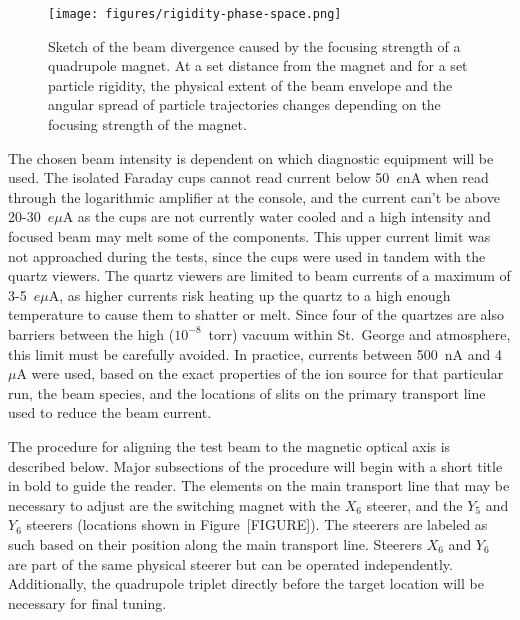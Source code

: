 \begin{figure}[t]
    \begin{center}
        \centerline{\texttt{[image: figures/rigidity-phase-space.png]}}
            \caption[Sketch of beam divergence due to focusing
            strength]{Sketch of the beam divergence caused by the
            focusing strength of a quadrupole magnet. At a set distance
            from the magnet and for a set particle rigidity, the
            physical extent of the beam envelope and the angular spread
            of particle trajectories changes depending on the focusing
            strength of the magnet.}
        \label{fig:divergence}
    \end{center}
\end{figure}

The chosen beam intensity is dependent on which diagnostic equipment
will be used. The isolated Faraday cups cannot read current below
50~$e$nA when read through the logarithmic amplifier at the console, and
the current can't be above 20-30~$e\mu$A as the cups are not currently
water cooled and a high intensity and focused beam may melt some of the
components. This upper current limit was not approached during the
tests, since the cups were used in tandem with the quartz viewers. The
quartz viewers are limited to beam currents of a maximum of 3-5~$e\mu$A,
as higher currents risk heating up the quartz to a high enough
temperature to cause them to shatter or melt. Since four of the quartzes
are also barriers between the high ($10^{-8}$~torr) vacuum within St.\
George and atmosphere, this limit must be carefully avoided. In
practice, currents between 500~nA and 4~$\mu$A were used, based on the
exact properties of the ion source for that particular run, the beam
species, and the locations of slits on the primary transport line used
to reduce the beam current.

The procedure for aligning the test beam to the magnetic optical axis is
described below. Major subsections of the procedure will begin with a
short title in bold to guide the reader. The elements on the main
transport line that may be necessary to adjust are the switching magnet
with the $X_6$ steerer, and the $Y_5$ and $Y_6$ steerers (locations
shown in Figure~[FIGURE]). The steerers are labeled as such based on
their position along the main transport line. Steerers $X_6$ and $Y_6$
are part of the same physical steerer but can be operated independently.
Additionally, the quadrupole triplet directly before the target location
will be necessary for final tuning.

